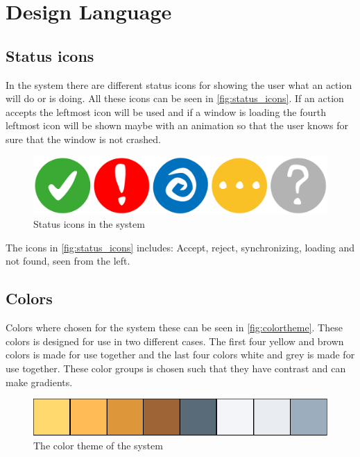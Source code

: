 \section{Design Language}
\label{design:design_language}

\subsection{Status icons}
\label{design:state_icons}

In the \giraf[] system there are different status icons for showing the user what an action will do or is doing. All these icons can be seen in \autoref{fig:status_icons}. If an action accepts the leftmost icon will be used and if a window is loading the fourth leftmost icon will be shown maybe with an animation so that the user knows for sure that the window is not crashed.

\begin{figure}[h!]
	\centering
	\includegraphics[width=\textwidth]{gfx/status_icons}
	\caption{Status icons in the \giraf[] system}
	\label{fig:status_icons}
\end{figure}

The icons in \autoref{fig:status_icons} includes: Accept, reject, synchronizing, loading and not found, seen from the left.

\subsection{Colors}
\label{design:giraf_colors}

Colors where chosen for the \giraf[] system these can be seen in \autoref{fig:colortheme}. These colors is designed for use in two different cases. The first four yellow and brown colors is made for use together and the last four colors white and grey is made for use together. These color groups is chosen such that they have contrast and can make gradients.

\begin{figure}[h!]
	\centering
	\includegraphics[width=\textwidth]{gfx/design_color_theme}
	\caption{The color theme of the \giraf[] system}
	\label{fig:colortheme}
\end{figure}

